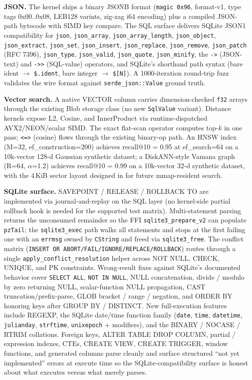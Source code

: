\textbf{JSON.} The kernel ships a binary JSONB format
(\texttt{magic 0x96}, format-v1, type tags 0x00..0x08, LEB128
varints, zig-zag i64 encoding) plus a compiled JSON-path bytecode
with SIMD key compare. The SQL surface delivers SQLite JSON1
compatibility for \texttt{json}, \texttt{json\_array},
\texttt{json\_array\_length}, \texttt{json\_object},
\texttt{json\_extract}, \texttt{json\_set}, \texttt{json\_insert},
\texttt{json\_replace}, \texttt{json\_remove}, \texttt{json\_patch}
(RFC 7396), \texttt{json\_type}, \texttt{json\_valid},
\texttt{json\_quote}, \texttt{json\_minify}, the \texttt{->}
(JSON-text) and \texttt{->>} (SQL-value) operators, and SQLite's
shorthand path syntax (bare ident $\rightarrow$ \texttt{\$.ident},
bare integer $\rightarrow$ \texttt{\$[N]}). A 1000-iteration
round-trip fuzz validates the wire format against
\texttt{serde\_json::Value} ground truth.

\textbf{Vector search.} A native VECTOR column carries
dimension-checked \texttt{f32} arrays through the existing Blob
storage class (no new \texttt{SqlValue} variant). Distance kernels
expose L2, Cosine, and InnerProduct via runtime-dispatched
AVX2/NEON/scalar SIMD. The exact flat-scan operator computes top-$k$
in one pass; \texttt{<=>} (cosine) flows through the existing
binary-op path. An HNSW
index~\cite{malkov2018hnsw} (M=32, ef\_construction=200) achieves
recall@10 = 0.95 at ef\_search=64 on a 10k-vector 128-d Gaussian
synthetic dataset; a DiskANN-style Vamana
graph~\cite{subramanya2019diskann} (R=64, $\alpha$=1.2) achieves
recall@10 = 0.99 on a 10k-vector 32-d synthetic dataset, with the
4\,KiB sector layout designed in for future mmap-resident search.

\textbf{SQLite surface.} SAVEPOINT / RELEASE / ROLLBACK TO are
implemented via journal-and-replay on the SQL layer (no kernel-side
partial rollback hook is needed for the supported test matrix).
Multi-statement parsing returns the unconsumed remainder so the FFI
\texttt{sqlite3\_prepare\_v2} can populate \texttt{pzTail}; the
\texttt{sqlite3\_exec} path walks all statements and stops at the
first failing one with an \texttt{errmsg} owned by \texttt{CString}
and freed via \texttt{sqlite3\_free}. The conflict matrix
(\texttt{INSERT OR ABORT/FAIL/IGNORE/REPLACE/ROLLBACK}) routes through
a single \texttt{apply\_conflict\_resolution} helper across NOT NULL,
CHECK, UNIQUE, and PK constraints. Wrong-result fixes against
SQLite's documented behavior cover \texttt{SELECT ALL},
\texttt{NOT IN NULL}, NULL concatenation, divide / modulo by zero
returning NULL, scalar-function NULL propagation, CAST
truncation/prefix-parse, GLOB bracket / range / negation, and
ORDER BY honoring keys after GROUP BY / DISTINCT. New full-execution
features include REGEXP, the SQLite date/time function family
(\texttt{date}, \texttt{time}, \texttt{datetime}, \texttt{julianday},
\texttt{strftime}, \texttt{unixepoch} + modifiers), and the BINARY /
NOCASE / RTRIM collations. Foreign keys, ALTER TABLE DROP COLUMN,
partial / expression indexes, CTEs, CREATE VIEW, CREATE TRIGGER,
window functions, and generated columns parse cleanly and surface
structured ``not yet implemented'' errors at execute time so the
SQLite-compatibility surface is honest about what executes versus
what merely parses.

